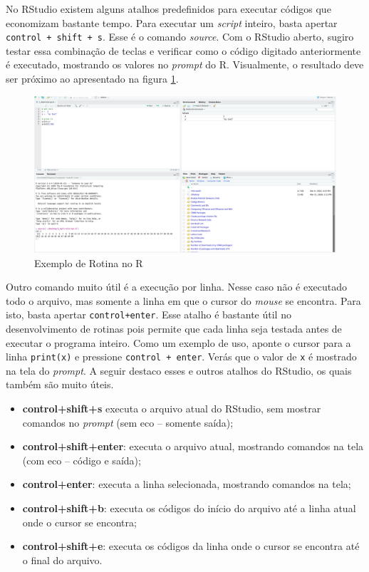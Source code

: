 \documentclass[
  11pt,
]{book}
\providecommand{\tightlist}{%
  \setlength{\itemsep}{0pt}\setlength{\parskip}{0pt}}
\begin{document}
No RStudio existem alguns atalhos predefinidos para executar códigos que economizam bastante tempo. Para executar um \emph{script} inteiro, basta apertar \texttt{control\ +\ shift\ +\ s}. Esse é o comando \emph{source}. Com o RStudio aberto, sugiro testar essa combinação de teclas e verificar como o código digitado anteriormente é executado, mostrando os valores no \emph{prompt} do R. Visualmente, o resultado deve ser próximo ao apresentado na figura \ref{fig:example-script-source}.

\begin{figure}[!htbp]

{\centering \includegraphics[width=1\linewidth]{00-text-resources/figs/RStudio_example_script_source} 

}

\caption{Exemplo de Rotina no R}\label{fig:example-script-source}
\end{figure}

Outro comando muito útil é a execução por linha. Nesse caso não é executado todo o arquivo, mas somente a linha em que o cursor do \emph{mouse} se encontra. Para isto, basta apertar \texttt{control+enter}. Esse atalho é bastante útil no desenvolvimento de rotinas pois permite que cada linha seja testada antes de executar o programa inteiro. Como um exemplo de uso, aponte o cursor para a linha \texttt{print(x)} e pressione \texttt{control\ +\ enter}. Verás que o valor de \texttt{x} é mostrado na tela do \emph{prompt}. A seguir destaco esses e outros atalhos do RStudio, os quais também são muito úteis.

\begin{itemize}
\tightlist
\item
  \textbf{control+shift+s} executa o arquivo atual do RStudio, sem mostrar comandos no \emph{prompt} (sem eco -- somente saída);
\item
  \textbf{control+shift+enter}: executa o arquivo atual, mostrando comandos na tela (com eco -- código e saída);
\item
  \textbf{control+enter}: executa a linha selecionada, mostrando comandos na tela;
\item
  \textbf{control+shift+b}: executa os códigos do início do arquivo até a linha atual onde o cursor se encontra;
\item
  \textbf{control+shift+e}: executa os códigos da linha onde o cursor se encontra até o final do arquivo.
\end{itemize}
\end{document}
